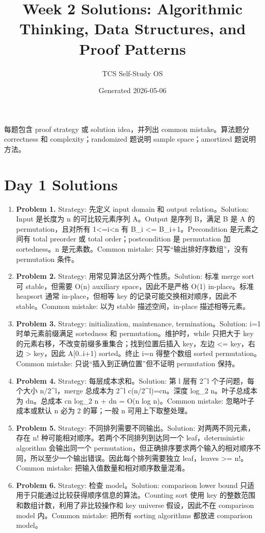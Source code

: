 \documentclass[11pt]{ctexart}
\title{Week 2 Solutions: Algorithmic Thinking, Data Structures, and Proof Patterns}
\author{TCS Self-Study OS}
\date{Generated 2026-05-06}
\begin{document}
\maketitle

每题包含 proof strategy 或 solution idea，并列出 common mistake。算法题分 correctness 和 complexity；randomized 题说明 sample space；amortized 题说明方法。

\section{Day 1 Solutions}
\begin{enumerate}
  \item \textbf{Problem 1.} Strategy: 先定义 input domain 和 output relation。Solution: Input 是长度为 n 的可比较元素序列 A。Output 是序列 B，满足 B 是 A 的 permutation，且对所有 1<=i<n 有 B\_i <= B\_{i+1}。Precondition 是元素之间有 total preorder 或 total order；postcondition 是 permutation 加 sortedness。n 是元素数。Common mistake: 只写“输出排好序数组”，没有 permutation 条件。
  \item \textbf{Problem 2.} Strategy: 用常见算法区分两个性质。Solution: 标准 merge sort 可 stable，但需要 O(n) auxiliary space，因此不是严格 O(1) in-place。标准 heapsort 通常 in-place，但相等 key 的记录可能交换相对顺序，因此不 stable。Common mistake: 以为 stable 描述空间，in-place 描述相等元素。
  \item \textbf{Problem 3.} Strategy: initialization, maintenance, termination。Solution: i=1 时单元素前缀满足 sortedness 和 permutation。维护时，while 只把大于 key 的元素右移，不改变前缀多重集合；找到位置后插入 key，左边 <= key，右边 > key，因此 A[0..i+1) sorted。终止 i=n 得整个数组 sorted permutation。Common mistake: 只说“插入到正确位置”但不证明 permutation 保持。
  \item \textbf{Problem 4.} Strategy: 每层成本求和。Solution: 第 l 层有 2\textasciicircum{}l 个子问题，每个大小 n/2\textasciicircum{}l，merge 总成本为 2\textasciicircum{}l c(n/2\textasciicircum{}l)=cn。深度 log\_2 n。叶子总成本为 dn。总成本 cn log\_2 n + dn = O(n log n)。Common mistake: 忽略叶子成本或默认 n 必为 2 的幂；一般 n 可用上下取整处理。
  \item \textbf{Problem 5.} Strategy: 不同排列需要不同输出。Solution: 对两两不同元素，存在 n! 种可能相对顺序。若两个不同排列到达同一个 leaf，deterministic algorithm 会输出同一个 permutation，但正确排序要求两个输入的相对顺序不同，所以至少一个输出错误。因此每个排列需要独立 leaf，leaves >= n!。Common mistake: 把输入值数量和相对顺序数量混淆。
  \item \textbf{Problem 6.} Strategy: 检查 model。Solution: comparison lower bound 只适用于只能通过比较获得顺序信息的算法。Counting sort 使用 key 的整数范围和数组计数，利用了非比较操作和 key universe 假设，因此不在 comparison model 内。Common mistake: 把所有 sorting algorithms 都放进 comparison model。

\end{enumerate}
\end{document}

